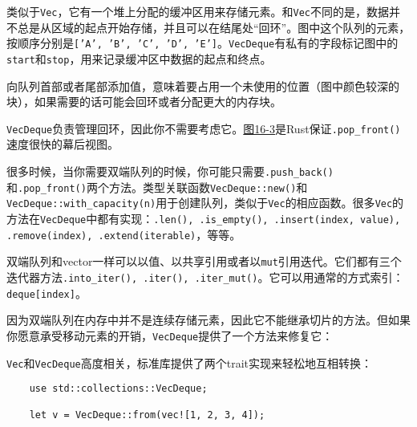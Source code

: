 类似于\texttt{Vec}，它有一个堆上分配的缓冲区用来存储元素。和\texttt{Vec}不同的是，数据并不总是从区域的起点开始存储，并且可以在结尾处“回环”。图中这个队列的元素，按顺序分别是\texttt{['A', 'B', 'C', 'D', 'E']}。\texttt{VecDeque}有私有的字段标记图中的\texttt{start}和\texttt{stop}，用来记录缓冲区中数据的起点和终点。

向队列首部或者尾部添加值，意味着要占用一个未使用的位置（图中颜色较深的块），如果需要的话可能会回环或者分配更大的内存块。

\texttt{VecDeque}负责管理回环，因此你不需要考虑它。\hyperref[f16-3]{图16-3}是Rust保证\texttt{.pop\_front()}速度很快的幕后视图。

很多时候，当你需要双端队列的时候，你可能只需要\texttt{.push\_back()}和\texttt{.pop\_front()}两个方法。类型关联函数\texttt{VecDeque::new()}和\texttt{VecDeque::with\_capacity(n)}用于创建队列，类似于\texttt{Vec}的相应函数。很多\texttt{Vec}的方法在\texttt{VecDeque}中都有实现：\texttt{.len(), .is\_empty(), .insert(index, value), .remove(index), .extend(iterable)}，等等。

双端队列和vector一样可以以值、以共享引用或者以\texttt{mut}引用迭代。它们都有三个迭代器方法\texttt{.into\_iter(), .iter(), .iter\_mut()}。它可以用通常的方式索引：\texttt{deque[index]}。

因为双端队列在内存中并不是连续存储元素，因此它不能继承切片的方法。但如果你愿意承受移动元素的开销，\texttt{VecDeque}提供了一个方法来修复它：


\texttt{Vec}和\texttt{VecDeque}高度相关，标准库提供了两个trait实现来轻松地互相转换：



\begin{verbatim}
    use std::collections::VecDeque;

    let v = VecDeque::from(vec![1, 2, 3, 4]);
\end{verbatim}

